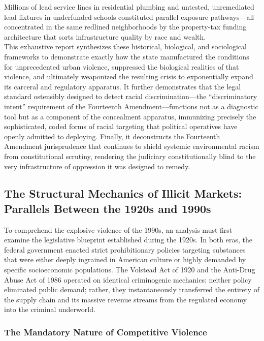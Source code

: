 \documentclass[
]{article}
\begin{document}
Millions of lead service lines in residential plumbing and untested,
unremediated lead fixtures in underfunded schools constituted parallel
exposure pathways---all concentrated in the same redlined neighborhoods
by the property-tax funding architecture that sorts infrastructure
quality by race and wealth.\\
This exhaustive report synthesizes these historical, biological, and
sociological frameworks to demonstrate exactly how the state
manufactured the conditions for unprecedented urban violence, suppressed
the biological realities of that violence, and ultimately weaponized the
resulting crisis to exponentially expand its carceral and regulatory
apparatus. It further demonstrates that the legal standard ostensibly
designed to detect racial discrimination---the ``discriminatory intent''
requirement of the Fourteenth Amendment---functions not as a diagnostic
tool but as a component of the concealment apparatus, immunizing
precisely the sophisticated, coded forms of racial targeting that
political operatives have openly admitted to deploying. Finally, it
deconstructs the Fourteenth Amendment jurisprudence that continues to
shield systemic environmental racism from constitutional scrutiny,
rendering the judiciary constitutionally blind to the very
infrastructure of oppression it was designed to remedy.

\subsection{\texorpdfstring{\textbf{The Structural Mechanics of Illicit
Markets: Parallels Between the 1920s and
1990s}}{The Structural Mechanics of Illicit Markets: Parallels Between the 1920s and 1990s}}\label{the-structural-mechanics-of-illicit-markets-parallels-between-the-1920s-and-1990s}

To comprehend the explosive violence of the 1990s, an analysis must
first examine the legislative blueprint established during the 1920s. In
both eras, the federal government enacted strict prohibitionary policies
targeting substances that were either deeply ingrained in American
culture or highly demanded by specific socioeconomic populations. The
Volstead Act of 1920 and the Anti-Drug Abuse Act of 1986 operated on
identical criminogenic mechanics: neither policy eliminated public
demand; rather, they instantaneously transferred the entirety of the
supply chain and its massive revenue streams from the regulated economy
into the criminal underworld.

\subsubsection{\texorpdfstring{\textbf{The Mandatory Nature of
Competitive
Violence}}{The Mandatory Nature of Competitive Violence}}\label{the-mandatory-nature-of-competitive-violence}
\end{document}
